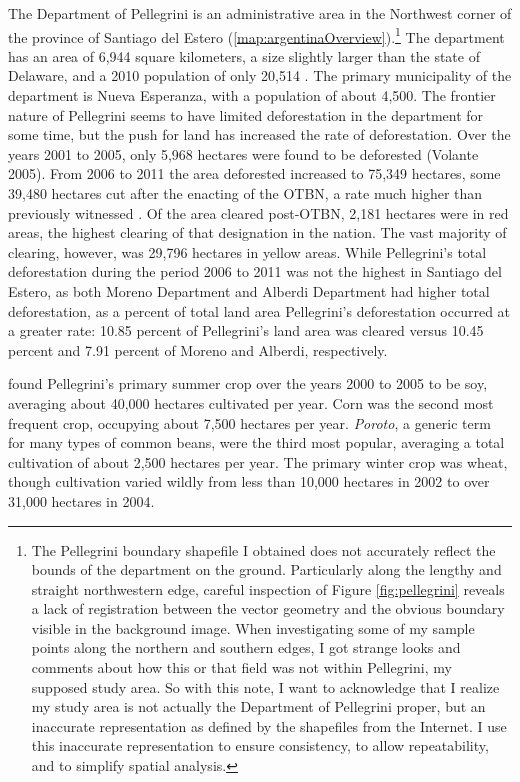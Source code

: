 The Department of Pellegrini is an administrative area in the Northwest corner of the province of Santiago del Estero (\autoref{map:argentinaOverview}).\footnote{The Pellegrini boundary shapefile I obtained does not accurately reflect the bounds of the department on the ground. Particularly along the lengthy and straight northwestern edge, careful inspection of Figure \ref{fig:pellegrini} reveals a lack of registration between the vector geometry and the obvious boundary visible in the background image. When investigating some of my sample points along the northern and southern edges, I got strange looks and comments about how this or that field was not within Pellegrini, my supposed study area. So with this note, I want to acknowledge that I realize my study area is not actually the Department of Pellegrini proper, but an inaccurate representation as defined by the shapefiles from the Internet. I use this inaccurate representation to ensure consistency, to allow repeatability, and to simplify spatial analysis.} The department has an area of 6,944 square kilometers, a size slightly larger than the state of Delaware, and a 2010 population of only 20,514 \autocite{estadistica-y-c2010b}. The primary municipality of the department is Nueva Esperanza, with a population of about 4,500. The frontier nature of Pellegrini seems to have limited deforestation in the department for some time, but the push for land has increased the rate of deforestation. Over the years 2001 to 2005, only 5,968 hectares were found to be deforested (Volante 2005). From 2006 to 2011 the area deforested increased to 75,349 hectares, some 39,480 hectares cut after the enacting of the OTBN, a rate much higher than previously witnessed \autocite{secreteria-de-a2012monitoreo}. Of the area cleared post-OTBN, 2,181 hectares were in red areas, the highest clearing of that designation in the nation. The vast majority of clearing, however, was 29,796 hectares in yellow areas. While Pellegrini’s total deforestation during the period 2006 to 2011 was not the highest in Santiago del Estero, as both Moreno Department and Alberdi Department had higher total deforestation, as a percent of total land area Pellegrini’s deforestation occurred at a greater rate: 10.85 percent of Pellegrini’s land area was cleared versus 10.45 percent and 7.91 percent of Moreno and Alberdi, respectively.

\textcite{volante2005analisis} found Pellegrini's primary summer crop over the years 2000 to 2005 to be soy, averaging about 40,000 hectares cultivated per year. Corn was the second most frequent crop, occupying about 7,500 hectares per year. \textit{Poroto}, a generic term for many types of common beans, were the third most popular, averaging a total cultivation of about 2,500 hectares per year. The primary winter crop was wheat, though cultivation varied wildly from less than 10,000 hectares in 2002 to over 31,000 hectares in 2004.


